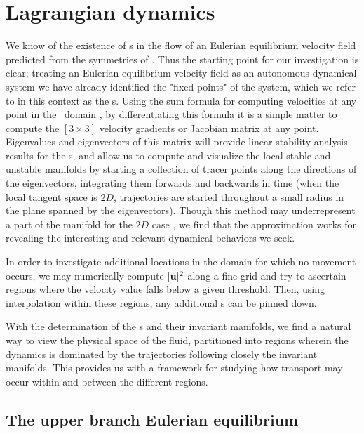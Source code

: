 
\section{Lagrangian dynamics}
\label{s:Lagrangian}

We know of the existence of  \stagp s in the flow of an Eulerian equilibrium 
velocity field predicted from the symmetries of \pCf. Thus the starting 
point for our investigation is clear; treating an Eulerian equilibrium velocity 
field as an autonomous dynamical system we have already identified the 
"fixed points" of the system, which we refer to in this context as the 
\stagp s.  Using the sum formula for computing velocities at any point in 
the \pCf\ domain , by differentiating this formula 
it is a simple matter to compute the $[3\!\times\! 3]$ velocity gradients 
or Jacobian matrix at any point. Eigenvalues and eigenvectors of this 
matrix will provide linear stability analysis results for the {\stagp}s, 
and allow us to compute and visualize the local stable and unstable 
manifolds by starting a collection of tracer points along the directions 
of the eigenvectors, integrating them forwards and backwards in time 
(when the local tangent space is $2D$, trajectories are started 
throughout a small radius in the plane spanned by the eigenvectors). 
Though this method may underrepresent a part of the manifold for the $2D$ 
case \citep{SahVla09}, we find that the approximation works for revealing 
the interesting and relevant dynamical behaviors we seek. 

In order to investigate additional locations in the domain for which no 
movement occurs, we may numerically compute $|{\bf u}|^{2}$ along a fine grid 
and try to ascertain regions where the velocity value falls below a given 
threshold. Then, using interpolation within these regions, any additional  
\stagp s can be pinned down. 

With the determination of the {\stagp}s and their invariant manifolds, we 
find a natural way to view the physical space of the fluid, partitioned 
into regions wherein the dynamics is dominated by the trajectories 
following closely the invariant manifolds. This provides us with a 
framework for studying how transport may occur within and between the 
different regions. 

\subsection{The upper branch Eulerian equilibrium}
\label{s:eq2}

